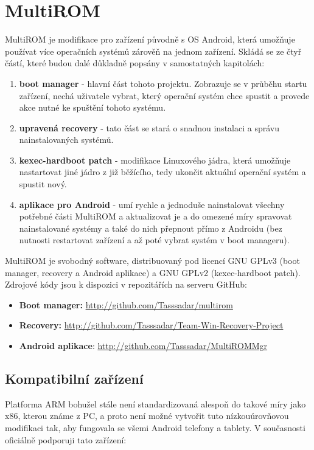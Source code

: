 \documentclass[12pt, a4paper, oneside]{article}
\newcommand{\B}{\textbf} %
\begin{document}
\section{MultiROM}
MultiROM je modifikace pro zařízení původně s OS Android, která umožňuje používat více operačních systémů zárověň na jednom zařízení. Skládá se ze čtyř částí, které budou dalé důkladně popsány v samostatných kapitolách:

\begin{enumerate}
    \item \B{boot manager} - hlavní část tohoto projektu. Zobrazuje se v průběhu startu zařízení, nechá uživatele vybrat, který operační systém chce spustit a provede akce nutné ke spuštění tohoto systému.
    \item \B{upravená recovery} - tato část se stará o snadnou instalaci a správu nainstalovaných systémů.
    \item \B{kexec-hardboot patch} - modifikace Linuxového jádra, která umožňuje nastartovat jiné jádro z již běžícího, tedy ukončit aktuální operační systém a spustit nový.
    \item \B{aplikace pro Android} - umí rychle a jednoduše nainstalovat všechny potřebné části MultiROM a aktualizovat je a do omezené míry spravovat nainstalované systémy a také do nich přepnout přímo z Androidu (bez nutnosti restartovat zařízení a až poté vybrat systém v boot manageru).
\end{enumerate}

MultiROM je svobodný software, distribuovaný pod licencí GNU GPLv3 (boot manager, recovery a Android aplikace) a GNU GPLv2 (kexec-hardboot patch). Zdrojové kódy jsou k dispozici v repozitářích na serveru GitHub:
\begin{itemize}
    \item \B{Boot manager:} \url{http://github.com/Tasssadar/multirom}
    \item \B{Recovery:} \url{http://github.com/Tasssadar/Team-Win-Recovery-Project}
    \item \B{Android aplikace}: \url{http://github.com/Tasssadar/MultiROMMgr}
\end{itemize}

\subsection{Kompatibilní zařízení}
Platforma ARM bohužel stále není standardizovaná alespoň do takové míry jako x86, kterou známe z PC, a proto není možné vytvořit tuto nízkouúrovňovou modifikaci tak, aby fungovala se všemi Android telefony a tablety. V současnosti oficiálně podporuji tato zařízení:
\end{document}
